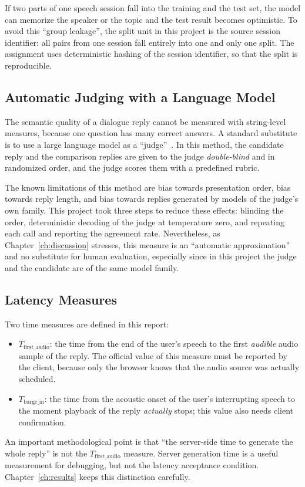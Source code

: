 If two parts of one speech session fall into the training and the test set, the
model can memorize the speaker or the topic and the test result becomes optimistic.
To avoid this ``group leakage'', the split unit in this project is the source
session identifier: all pairs from one session fall entirely into one and only one
split. The assignment uses deterministic hashing of the session identifier, so that
the split is reproducible.

\subsection{Automatic Judging with a Language Model}
\label{sec:judge}

The semantic quality of a dialogue reply cannot be measured with string-level
measures, because one question has many correct answers. A standard substitute is
to use a large language model as a ``judge''~\cite{zheng2023mtbench}. In this method,
the candidate reply and the comparison replies are given to the judge
\emph{double-blind} and in randomized order, and the judge scores them with a
predefined rubric.

The known limitations of this method are bias towards presentation order, bias
towards reply length, and bias towards replies generated by models of the judge's
own family. This project took three steps to reduce these effects: blinding the
order, deterministic decoding of the judge at temperature zero, and repeating each
call and reporting the agreement rate. Nevertheless, as Chapter~\ref{ch:discussion}
stresses, this measure is an ``automatic approximation'' and no substitute for human
evaluation, especially since in this project the judge and the candidate are of the
same model family.

\subsection{Latency Measures}
\label{sec:latency-prelim}

Two time measures are defined in this report:

\begin{itemize}
\item $T_{\text{first\_audio}}$: the time from the end of the user's speech to the
      first \emph{audible} audio sample of the reply. The official value of this
      measure must be reported by the client, because only the browser knows that
      the audio source was actually scheduled.
\item $T_{\text{barge\_in}}$: the time from the acoustic onset of the user's
      interrupting speech to the moment playback of the reply \emph{actually} stops;
      this value also needs client confirmation.
\end{itemize}

An important methodological point is that ``the server-side time to generate the
whole reply'' is not the $T_{\text{first\_audio}}$ measure. Server generation time is
a useful measurement for debugging, but not the latency acceptance condition.
Chapter~\ref{ch:results} keeps this distinction carefully.
